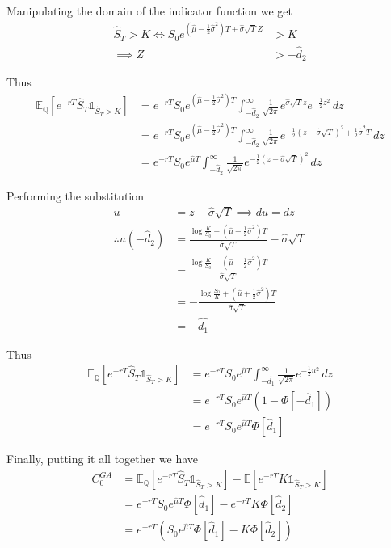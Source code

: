 \documentclass[12pt]{article}
\begin{document}
Manipulating the domain of the indicator function we get
\begin{align*}
	\hat{S}_T > K \iff S_0 e^{ \left(\hat{\mu} - \frac{1}{2}\hat{\sigma}^2\right)T + \hat{\sigma}\sqrt{T}Z } &> K \\
	\implies Z &> -\hat{d}_2
\end{align*}

Thus
\begin{align*}
	\mathbb E_{\mathbb Q} \left[ e^{-rT} \hat{S}_T \mathds 1_{\hat{S}_T > K} \right] &= e^{-rT} S_0 e^{ \left(\hat{\mu} - \frac{1}{2}\hat{\sigma}^2\right)T} \int^\infty_{ -\hat{d}_2 } \frac{1}{\sqrt{2 \pi}} e^{\hat{\sigma}\sqrt{T}z } e^{ -\frac{1}{2}z^2 }\,dz \\
	&= e^{-rT} S_0 e^{ \left(\hat{\mu} - \frac{1}{2}\hat{\sigma}^2\right)T} \int^\infty_{ -\hat{d}_2 } \frac{1}{\sqrt{2 \pi}} e^{ -\frac{1}{2} \left(z - \hat{\sigma}\sqrt{T}\right)^2 + \frac{1}{2}\hat{\sigma}^2T }\,dz \\
	&= e^{-rT} S_0 e^{ \hat{\mu}T } \int^\infty_{ -\hat{d}_2 } \frac{1}{\sqrt{2 \pi}} e^{ -\frac{1}{2} \left(z - \hat{\sigma}\sqrt{T}\right)^2 }\,dz
\end{align*}

Performing the substitution
\begin{align*}
	u &= z - \hat{\sigma}\sqrt{T} \implies du = dz \\
	\therefore u\left( -\hat{d}_2 \right) &= \frac{\log \frac{K}{S_0} - \left(\hat{\mu} - \frac{1}{2}\hat{\sigma}^2\right) T }{ \hat{\sigma}\sqrt{T} } - \hat{\sigma}\sqrt{T} \\
	&= \frac{\log \frac{K}{S_0} - \left(\hat{\mu} + \frac{1}{2}\hat{\sigma}^2\right) T }{ \hat{\sigma}\sqrt{T} } \\
	&= -\frac{\log \frac{S_0}{K} + \left(\hat{\mu} + \frac{1}{2}\hat{\sigma}^2\right) T }{ \hat{\sigma}\sqrt{T} } \\
	&= -\hat{d_1}
\end{align*}

Thus
\begin{align*}
	\mathbb E_{\mathbb Q} \left[ e^{-rT} \hat{S}_T \mathds 1_{\hat{S}_T > K} \right] &= e^{-rT} S_0 e^{ \hat{\mu}T } \int^\infty_{-\hat{d_1}} \frac{1}{\sqrt{2 \pi}} e^{ -\frac{1}{2} u^2 }\,dz \\
	 &= e^{-rT} S_0 e^{ \hat{\mu}T } \left(1 - \Phi[-\hat{d}_1]\right) \\
	 &= e^{-rT} S_0 e^{ \hat{\mu}T }\Phi[\hat{d}_1]
\end{align*}

Finally, putting it all together we have
\begin{align*}
	C^{GA}_0 &= \mathbb E_{\mathbb Q} \left[ e^{-rT} \hat{S}_T \mathds 1_{\hat{S}_T > K} \right] - \mathbb E \left[e^{-rT}K \mathds 1_{\hat{S}_T > K} \right] \\
	&=  e^{-rT} S_0 e^{ \hat{\mu}T }\Phi[\hat{d}_1] - e^{-rT}K \Phi[\hat{d}_2] \\
	&= e^{-rT} \left(  S_0 e^{ \hat{\mu}T }\Phi[\hat{d}_1] - K \Phi[\hat{d}_2] \right)
\end{align*}
\end{document}
